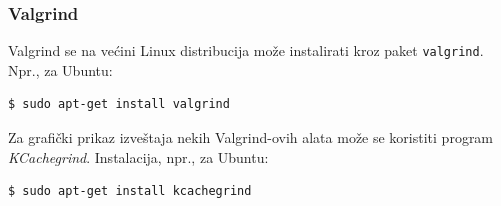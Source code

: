 \subsubsection{Valgrind}\label{instalacija-valgrind}

Valgrind se na većini Linux distribucija može instalirati kroz paket \texttt{valgrind}. Npr., za Ubuntu:

\begin{verbatim}
$ sudo apt-get install valgrind
\end{verbatim}

Za grafički prikaz izveštaja nekih Valgrind-ovih alata može se koristiti program \emph{KCachegrind}. Instalacija, npr., za Ubuntu:

\begin{verbatim}
$ sudo apt-get install kcachegrind
\end{verbatim}
